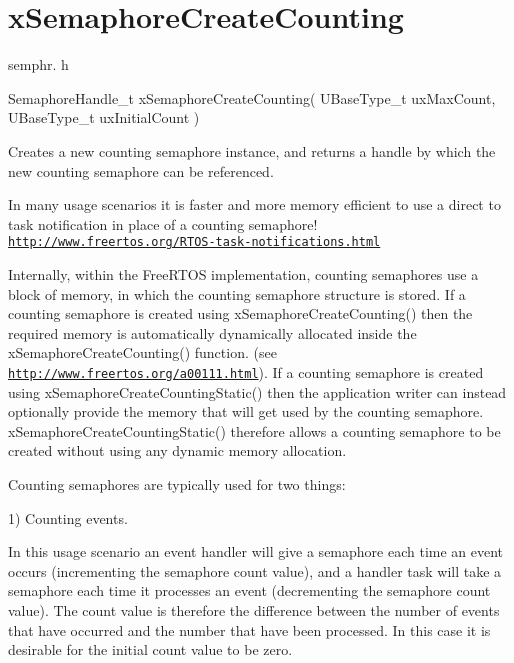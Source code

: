 \hypertarget{group__x_semaphore_create_counting}{}\section{x\+Semaphore\+Create\+Counting}
\label{group__x_semaphore_create_counting}
semphr. h 
\begin{DoxyPre}SemaphoreHandle\_t xSemaphoreCreateCounting( UBaseType\_t uxMaxCount, UBaseType\_t uxInitialCount )\end{DoxyPre}


Creates a new counting semaphore instance, and returns a handle by which the new counting semaphore can be referenced.

In many usage scenarios it is faster and more memory efficient to use a direct to task notification in place of a counting semaphore! \href{http://www.freertos.org/RTOS-task-notifications.html}{\tt http\+://www.\+freertos.\+org/\+R\+T\+O\+S-\/task-\/notifications.\+html}

Internally, within the Free\+R\+T\+OS implementation, counting semaphores use a block of memory, in which the counting semaphore structure is stored. If a counting semaphore is created using x\+Semaphore\+Create\+Counting() then the required memory is automatically dynamically allocated inside the x\+Semaphore\+Create\+Counting() function. (see \href{http://www.freertos.org/a00111.html}{\tt http\+://www.\+freertos.\+org/a00111.\+html}). If a counting semaphore is created using x\+Semaphore\+Create\+Counting\+Static() then the application writer can instead optionally provide the memory that will get used by the counting semaphore. x\+Semaphore\+Create\+Counting\+Static() therefore allows a counting semaphore to be created without using any dynamic memory allocation.

Counting semaphores are typically used for two things\+:

1) Counting events.

In this usage scenario an event handler will \textquotesingle{}give\textquotesingle{} a semaphore each time an event occurs (incrementing the semaphore count value), and a handler task will \textquotesingle{}take\textquotesingle{} a semaphore each time it processes an event (decrementing the semaphore count value). The count value is therefore the difference between the number of events that have occurred and the number that have been processed. In this case it is desirable for the initial count value to be zero.

